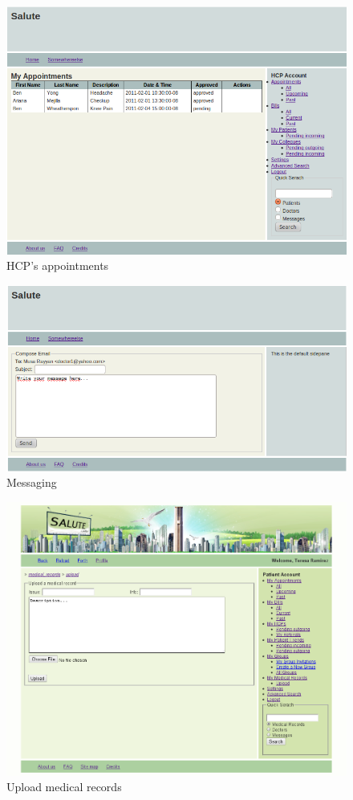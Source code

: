 \begin{figure}
\includegraphics[scale=0.6]{screenshots/doc_appointments.png}
\caption{HCP's appointments}
\end{figure}
\clearpage
\begin{figure}
\includegraphics[scale=0.6]{screenshots/Messaging.png}
\caption{Messaging}
\end{figure}

\begin{figure}
\includegraphics[scale=0.5]{screenshots/upload.png}
\caption{Upload medical records}
\end{figure}

